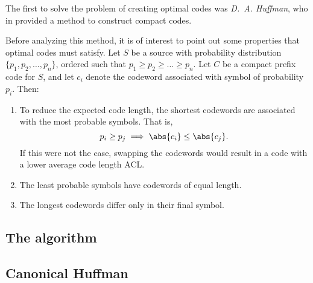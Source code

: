 \documentclass{subfiles}
\begin{document}
\label{Sec:2}
    The first to solve the problem of creating optimal codes was \emph{D.~A. Huffman},
        who in \cite{huffman1952} provided a method to construct compact codes.

    Before analyzing this method, it is of interest to point out some properties that optimal codes must satisfy.
        Let \(S\) be a source with probability distribution \(\{p_{1}, p_{2}, \ldots, p_{n}\}\),
        ordered such that \(p_{1} \ge p_{2} \ge \ldots \ge p_{n}\).
        Let \(C\) be a compact prefix code for \(S\), 
        and let \(c_{i}\) denote the codeword associated with symbol of probability \(p_{i}\).
        Then:

        \begin{enumerate}
            \item To reduce the expected code length, the shortest codewords are associated with the most probable symbols. 
                That is,
                \[
                    p_{i} \ge p_{j} \implies \abs{c_{i}} \le \abs{c_{j}}.
                \]
                If this were not the case, swapping the codewords would result in a code with a lower average code length ACL.

            \item The least probable symbols have codewords of equal length.

            \item The longest codewords differ only in their final symbol.
        \end{enumerate}

        \subsection{The algorithm}
        

        \subsection{Canonical Huffman}
        
        
\end{document}
